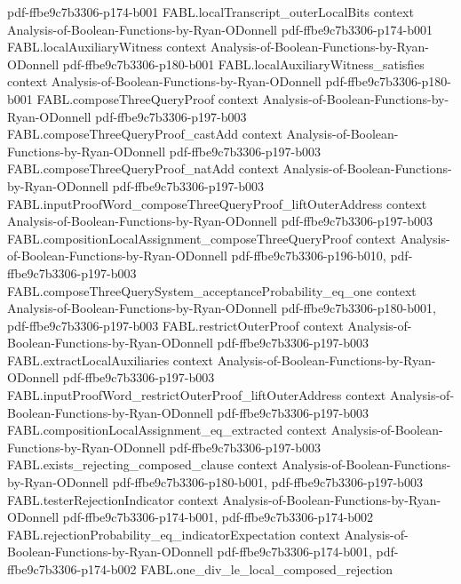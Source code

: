 \begin{theorem}
  {pdf-ffbe9c7b3306-p174-b001}
\proofstep
  {FABL.localTranscript_outerLocalBits}
  {context}
  {Analysis-of-Boolean-Functions-by-Ryan-ODonnell}
  {pdf-ffbe9c7b3306-p174-b001}
\proofstep
  {FABL.localAuxiliaryWitness}
  {context}
  {Analysis-of-Boolean-Functions-by-Ryan-ODonnell}
  {pdf-ffbe9c7b3306-p180-b001}
\proofstep
  {FABL.localAuxiliaryWitness_satisfies}
  {context}
  {Analysis-of-Boolean-Functions-by-Ryan-ODonnell}
  {pdf-ffbe9c7b3306-p180-b001}
\proofstep
  {FABL.composeThreeQueryProof}
  {context}
  {Analysis-of-Boolean-Functions-by-Ryan-ODonnell}
  {pdf-ffbe9c7b3306-p197-b003}
\proofstep
  {FABL.composeThreeQueryProof_castAdd}
  {context}
  {Analysis-of-Boolean-Functions-by-Ryan-ODonnell}
  {pdf-ffbe9c7b3306-p197-b003}
\proofstep
  {FABL.composeThreeQueryProof_natAdd}
  {context}
  {Analysis-of-Boolean-Functions-by-Ryan-ODonnell}
  {pdf-ffbe9c7b3306-p197-b003}
\proofstep
  {FABL.inputProofWord_composeThreeQueryProof_liftOuterAddress}
  {context}
  {Analysis-of-Boolean-Functions-by-Ryan-ODonnell}
  {pdf-ffbe9c7b3306-p197-b003}
\proofstep
  {FABL.compositionLocalAssignment_composeThreeQueryProof}
  {context}
  {Analysis-of-Boolean-Functions-by-Ryan-ODonnell}
  {pdf-ffbe9c7b3306-p196-b010,
    pdf-ffbe9c7b3306-p197-b003}
\proofstep
  {FABL.composeThreeQuerySystem_acceptanceProbability_eq_one}
  {context}
  {Analysis-of-Boolean-Functions-by-Ryan-ODonnell}
  {pdf-ffbe9c7b3306-p180-b001,
    pdf-ffbe9c7b3306-p197-b003}
\proofstep
  {FABL.restrictOuterProof}
  {context}
  {Analysis-of-Boolean-Functions-by-Ryan-ODonnell}
  {pdf-ffbe9c7b3306-p197-b003}
\proofstep
  {FABL.extractLocalAuxiliaries}
  {context}
  {Analysis-of-Boolean-Functions-by-Ryan-ODonnell}
  {pdf-ffbe9c7b3306-p197-b003}
\proofstep
  {FABL.inputProofWord_restrictOuterProof_liftOuterAddress}
  {context}
  {Analysis-of-Boolean-Functions-by-Ryan-ODonnell}
  {pdf-ffbe9c7b3306-p197-b003}
\proofstep
  {FABL.compositionLocalAssignment_eq_extracted}
  {context}
  {Analysis-of-Boolean-Functions-by-Ryan-ODonnell}
  {pdf-ffbe9c7b3306-p197-b003}
\proofstep
  {FABL.exists_rejecting_composed_clause}
  {context}
  {Analysis-of-Boolean-Functions-by-Ryan-ODonnell}
  {pdf-ffbe9c7b3306-p180-b001,
    pdf-ffbe9c7b3306-p197-b003}
\proofstep
  {FABL.testerRejectionIndicator}
  {context}
  {Analysis-of-Boolean-Functions-by-Ryan-ODonnell}
  {pdf-ffbe9c7b3306-p174-b001,
    pdf-ffbe9c7b3306-p174-b002}
\proofstep
  {FABL.rejectionProbability_eq_indicatorExpectation}
  {context}
  {Analysis-of-Boolean-Functions-by-Ryan-ODonnell}
  {pdf-ffbe9c7b3306-p174-b001,
    pdf-ffbe9c7b3306-p174-b002}
\proofstep
  {FABL.one_div_le_local_composed_rejection}

\end{theorem}
